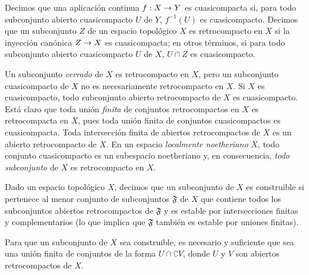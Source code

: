 \documentclass[oneside]{amsart}
\makeatletter
\newcommand{\ega@arrow}[2]{\mathchoice{#1}{#2}{#2}{#2}}
\renewcommand{\to}{\ega@arrow{\longrightarrow}{\rightarrow}}
\let\EGAOriginalLabel\label
\renewcommand{\label}[1]{\phantomsection\EGAOriginalLabel{#1}}
\makeatother
\begin{document}
\begin{definition}[9.1.1]
\label{0.9.1.1}
Decimos que una aplicación continua $f:X\to Y$ es cuasicompacta si, para todo subconjunto abierto cuasicompacto $U$ de $Y$, $f^{-1}(U)$ es cuasicompacto.
Decimos que un subconjunto $Z$ de un espacio topológico $X$ es retrocompacto en $X$ si la inyección canónica $Z\to X$ es cuasicompacta; en otros términos, si para todo subconjunto abierto cuasicompacto $U$ de $X$, $U\cap Z$ es cuasicompacto.
\end{definition}

Un subconjunto \emph{cerrado} de $X$ es retrocompacto en $X$, pero un subconjunto cuasicompacto de $X$ no es necesariamente retrocompacto en $X$.
Si $X$ es cuasicompacto, todo subconjunto abierto retrocompacto de $X$ es cuasicompacto.
Está claro que toda unión \emph{finita} de conjuntos retrocompactos en $X$ es retrocompacta en $X$, pues toda unión finita de conjuntos cuasicompactos es cuasicompacta.
Toda intersección finita de abiertos retrocompactos de $X$ es un abierto retrocompacto de $X$.
En un espacio \emph{localmente noetheriano} $X$, todo conjunto cuasicompacto es un subespacio noetheriano y, en consecuencia, \emph{todo subconjunto} de $X$ es retrocompacto en $X$.

\begin{definition}[9.1.2]
\label{0.9.1.2}
Dado un espacio topológico $X$, decimos que un subconjunto de $X$ es construible si pertenece al menor conjunto de subconjuntos $\mathfrak{F}$ de $X$ que contiene todos los subconjuntos abiertos retrocompactos de $\mathfrak{F}$ y es estable por intersecciones finitas y complementarios \textup{(lo que implica que $\mathfrak{F}$ también es} estable por uniones finitas\textup{)}.
\end{definition}

\begin{proposition}[9.1.3]
\label{0.9.1.3}
Para que un subconjunto de $X$ sea construible, es necesario y suficiente que sea una unión finita de conjuntos de la forma $U\cap\complement{V}$, donde $U$ y $V$ son abiertos retrocompactos de $X$.
\end{proposition}
\end{document}
